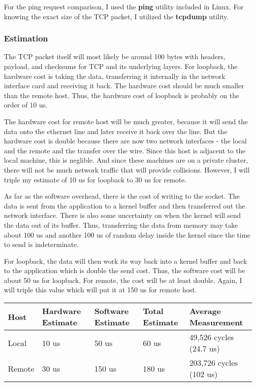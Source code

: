 \documentclass[paper=a4, fontsize=11pt]{scrartcl}
\numberwithin{equation}{section}        %
\numberwithin{figure}{section}          %
\numberwithin{table}{section}               %
\begin{document}
For the ping request comparison, I used the \textbf{ping} utility included in Linux.  For knowing the exact size of the TCP packet, I utilized the \textbf{tcpdump} utility.

\subsubsection{Estimation}

The TCP packet itself will most likely be around 100 bytes with headers, payload, and checksums for TCP and its underlying layers.  For loopback, the hardware cost is taking the data, transferring it internally in the network interface card and receiving it back.  The hardware cost should be much smaller than the remote host.  Thus, the hardware cost of loopback is probably on the order of 10 us.

The hardware cost for remote host will be much greater, because it will send the data onto the ethernet line and later receive it back over the line.  But the hardware cost is double because there are now two network interfaces - the local and the remote and the transfer over the wire.  Since this host is adjacent to the local machine, this is neglible.  And since these machines are on a private cluster, there will not be much network traffic that will provide collisions.  However, I will triple my estimate of 10 us for loopback to 30 us for remote.

As far as the software overhead, there is the cost of writing to the socket.  The data is sent from the application to a kernel buffer and then transferred out the network interface.  There is also some uncertainty on when the kernel will send the data out of its buffer.  Thus, transferring the data from memory may take about 100 us and another 100 us of random delay inside the kernel since the time to send is indeterminate.

For loopback, the data will then work its way back into a kernel buffer and back to the application which is double the send cost.  Thus, the software cost will be about 50 us for loopback.  For remote, the cost will be at least double.  Again, I will triple this value which will put it at 150 us for remote host.

\begin{center}
    \begin{tabular}{ | l | l | l | l | l |}
    \hline
    Host & Hardware Estimate & Software Estimate & Total Estimate & Average Measurement \\      \hline
    Local & 10 us & 50 us & 60 us & 49,526 cycles (24.7 us) \\ 
    Remote & 30 us & 150 us & 180 us & 203,726 cycles (102 us) \\
    \hline
    \end{tabular}
\end{center}
\end{document}
